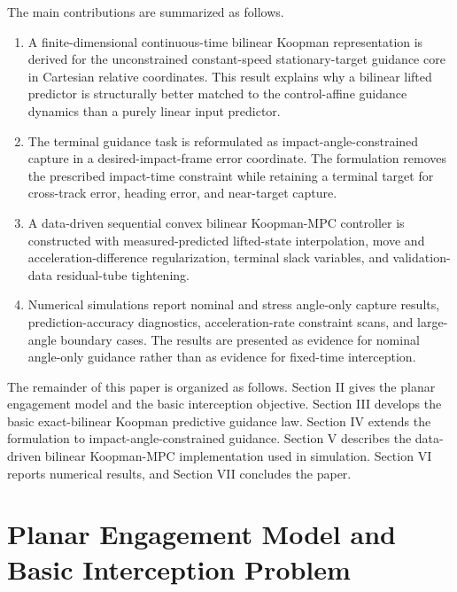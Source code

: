 \documentclass[letterpaper,journal]{IEEEtran}
\begin{document}
The main contributions are summarized as follows.
\begin{enumerate}
    \item A finite-dimensional continuous-time bilinear Koopman representation is derived for the unconstrained constant-speed stationary-target guidance core in Cartesian relative coordinates. This result explains why a bilinear lifted predictor is structurally better matched to the control-affine guidance dynamics than a purely linear input predictor.
    \item The terminal guidance task is reformulated as impact-angle-constrained capture in a desired-impact-frame error coordinate. The formulation removes the prescribed impact-time constraint while retaining a terminal target for cross-track error, heading error, and near-target capture.
    \item A data-driven sequential convex bilinear Koopman-MPC controller is constructed with measured-predicted lifted-state interpolation, move and acceleration-difference regularization, terminal slack variables, and validation-data residual-tube tightening.
    \item Numerical simulations report nominal and stress angle-only capture results, prediction-accuracy diagnostics, acceleration-rate constraint scans, and large-angle boundary cases. The results are presented as evidence for nominal angle-only guidance rather than as evidence for fixed-time interception.
\end{enumerate}

The remainder of this paper is organized as follows. Section II gives the planar engagement model and the basic interception objective. Section III develops the basic exact-bilinear Koopman predictive guidance law. Section IV extends the formulation to impact-angle-constrained guidance. Section V describes the data-driven bilinear Koopman-MPC implementation used in simulation. Section VI reports numerical results, and Section VII concludes the paper.

\section{Planar Engagement Model and Basic Interception Problem}
\end{document}
